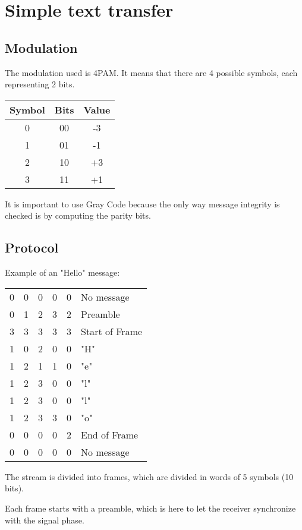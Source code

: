 \documentclass[12pt]{report}
\begin{document}
\section{Simple text transfer}

\subsection{Modulation}

The modulation used is 4PAM.
It means that there are 4 possible symbols, each representing 2 bits.

\begin{center}
\begin{tabular}{c|c|c}
Symbol&Bits&Value\\
\hline
0&00&-3\\
1&01&-1\\
2&10&+3\\
3&11&+1\\
\end{tabular}
\end{center}

It is important to use Gray Code because the only way message integrity is checked is by computing the parity bits.

\subsection{Protocol}

Example of an "Hello" message:

\begin{center}
\begin{tabular}{ccccc|l}
0&0&0&0&0&No message\\
0&1&2&3&2&Preamble\\
3&3&3&3&3&Start of Frame\\
1&0&2&0&0&"H"\\
1&2&1&1&0&"e"\\
1&2&3&0&0&"l"\\
1&2&3&0&0&"l"\\
1&2&3&3&0&"o"\\
0&0&0&0&2&End of Frame\\
0&0&0&0&0&No message\\
\end{tabular}
\end{center}

The stream is divided into frames, which are divided in words of 5 symbols (10 bits).

 Each frame starts with a preamble, which is here to let the receiver synchronize with the signal phase.
\end{document}
